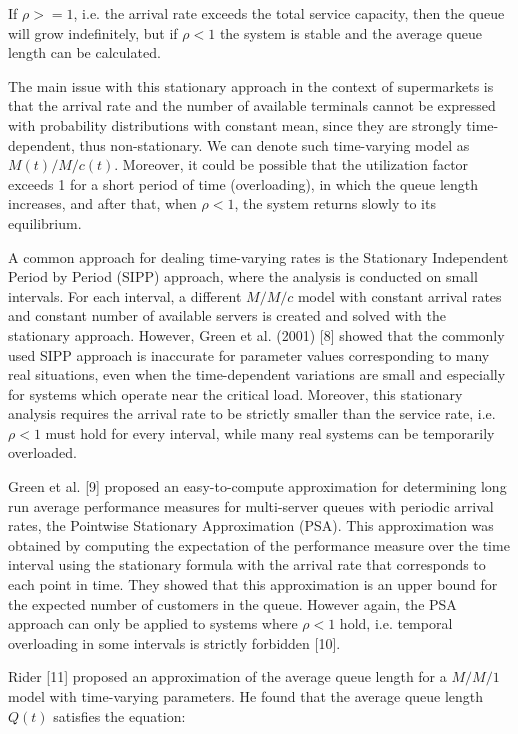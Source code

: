If $ \rho >= 1 $, i.e. the arrival rate exceeds the total service capacity, then the queue will grow indefinitely, but if $ \rho < 1 $ the system is stable and the average queue length can be calculated.

The main issue with this stationary approach in the context of supermarkets is that the arrival rate and the number of available terminals cannot be expressed with probability distributions with constant mean, since they are strongly time-dependent, thus non-stationary. We can denote such time-varying model as $ M(t)/M/c(t) $. Moreover, it could be possible that the utilization factor exceeds 1 for a short period of time (overloading), in which the queue length increases, and after that, when $ \rho < 1 $, the system returns slowly to its equilibrium.

A common approach for dealing time-varying rates is the Stationary Independent Period by Period (SIPP) approach, where the analysis is conducted on small intervals. For each interval, a different $ M/M/c $ model with constant arrival rates and constant number of available servers is created and solved with the stationary approach. However, Green et al. (2001) [8] showed that the commonly used SIPP approach is inaccurate for parameter values corresponding to many real situations, even when the time-dependent variations are small and especially for systems which operate near the critical load. Moreover, this stationary analysis requires the arrival rate to be strictly smaller than the service rate, i.e. $ \rho < 1 $ must hold for every interval, while many real systems can be temporarily overloaded.

Green et al. [9] proposed an easy-to-compute approximation for determining long run average performance measures for multi-server queues with periodic arrival rates, the Pointwise Stationary Approximation (PSA). This approximation was obtained by computing the expectation of the performance measure over the time interval using the stationary formula with the arrival rate that corresponds to each point in time. They showed that this approximation is an upper bound for the expected number of customers in the queue. However again, the PSA approach can only be applied to systems where $ \rho < 1 $ hold, i.e. temporal overloading in some intervals is strictly forbidden [10].

Rider [11] proposed an approximation of the average queue length for a $ M/M/1 $ model with time-varying parameters. He found that the average queue length $ Q(t) $ satisfies the equation:

